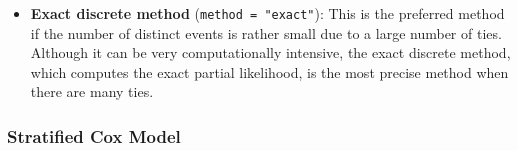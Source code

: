 \begin{itemize}
\begin{itemize}
\item \textbf{Exact discrete method} ({\tt method = "exact"}): This is the preferred method if the number of distinct events is rather small due to a large number of ties.  Although it can be very computationally intensive, the exact discrete method, which computes the exact partial likelihood, is the most precise method when there are many ties.  

\end{itemize}
\end{itemize}

\subsubsection{Stratified Cox Model}

